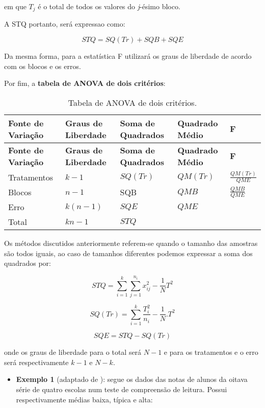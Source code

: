 \documentclass[
  openany]{book}
\providecommand{\tightlist}{%
  \setlength{\itemsep}{0pt}\setlength{\parskip}{0pt}}
\begin{document}
em que \(T_j\) é o total de todos os valores do \emph{j}-ésimo bloco.

A STQ portanto, será expressao como:

\begin{equation} 
STQ=SQ(Tr)+SQB+SQE
  \label{eq:sqtanova2crit}
\end{equation}

Da mesma forma, para a estatística F utilizará os graus de liberdade de acordo com os blocos e os erros.

Por fim, a \textbf{tabela de ANOVA de dois critérios}:

\begin{longtable}[]{@{}lllll@{}}
\caption{\label{tab:anova2} Tabela de ANOVA de dois critérios.}\tabularnewline
\toprule
\textbf{Fonte de Variação} & \textbf{Graus de Liberdade} & \textbf{Soma de Quadrados} & \textbf{Quadrado Médio} & \textbf{F}\tabularnewline
\midrule
\endfirsthead
\toprule
\textbf{Fonte de Variação} & \textbf{Graus de Liberdade} & \textbf{Soma de Quadrados} & \textbf{Quadrado Médio} & \textbf{F}\tabularnewline
\midrule
\endhead
Tratamentos & \(k-1\) & \(SQ(Tr)\) & \(QM(Tr)\) & \(\frac{QM(Tr)}{QME}\)\tabularnewline
Blocos & \(n-1\) & SQB & \(QMB\) & \(\frac{QMB}{QME}\)\tabularnewline
Erro & \(k(n-1)\) & \(SQE\) & \(QME\) &\tabularnewline
Total & \(kn-1\) & \(STQ\) & &\tabularnewline
\bottomrule
\end{longtable}

Os métodos discutidos anteriormente referem-se quando o tamanho das amostras são todos iguais, ao caso de tamanhos diferentes podemos expressar a soma dos quadrados por:

\begin{equation} 
STQ=\displaystyle \sum^k_{i=1} \displaystyle \sum^{n_i}_{j=1}x^2_{ij}-\frac{1}{N}T^2
  \label{eq:stqdiferente}
\end{equation}

\begin{equation} 
SQ(Tr)=\displaystyle \sum^k_{i=1}\frac{T_i^2}{n_i}-\frac{1}{N}.T^2
  \label{eq:sqtrdiferente}
\end{equation}

\begin{equation} 
SQE=STQ-SQ(Tr)
  \label{eq:sqediferente}
\end{equation}

onde os graus de liberdade para o total será \(N-1\) e para os tratamentos e o erro será respectivamente \(k-1\) e \(N-k\).

\begin{itemize}
\tightlist
\item
  \textbf{Exemplo 1} (adaptado de \citep{freund2009estatistica}): segue os dados das notas de alunos da oitava série de quatro escolas num teste de compreensão de leitura. Possui respectivamente médias baixa, típica e alta:
\end{itemize}
\end{document}
